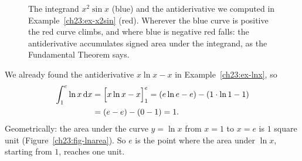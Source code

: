 \begin{figure}[H]
\centering
{}
\caption{The integrand $x^2\sin x$ (blue) and the antiderivative we computed in
Example~\ref{ch23:ex-x2sin} (red). Wherever the blue curve is positive the red
curve climbs, and where blue is negative red falls: the antiderivative
accumulates signed area under the integrand, as the Fundamental Theorem
says.}
\label{ch23:fig-x2sin}
\end{figure}

\begin{example}
\label{ch23:ex-deflnx}
We already found the antiderivative $x\ln x - x$ in Example~\ref{ch23:ex-lnx}, so
\begin{align*}
\int_1^{e} \ln x\,\mathrm{d} x &= \Big[x\ln x - x\Big]_{1}^{e}
= (e\ln e - e) - (1\cdot\ln 1 - 1)\\
&= (e - e) - (0 - 1) = 1.
\end{align*}
Geometrically: the area under the curve $y=\ln x$ from $x=1$ to $x=e$ is
$1$ square unit (Figure~\ref{ch23:fig-lnarea}). So $e$ is the point where the
area under $\ln x$, starting from $1$, reaches one unit.
\end{example}

